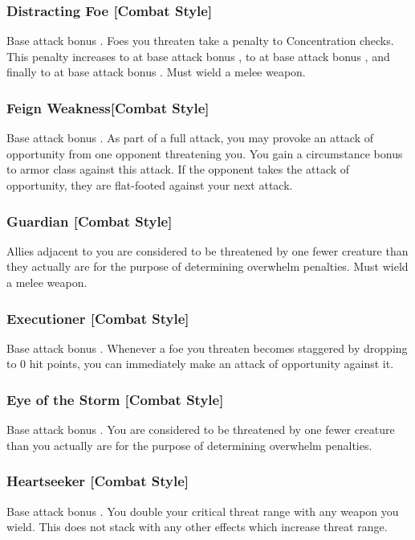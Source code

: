 \subsubsection{Distracting Foe [Combat Style]}
 Base attack bonus .
 Foes you threaten take a  penalty to Concentration checks. This penalty increases to  at base attack bonus , to  at base attack bonus , and finally to  at base attack bonus .
 Must wield a melee weapon.

\subsubsection{Feign Weakness[Combat Style]}
\featpre Base attack bonus .
\featben As part of a full attack, you may provoke an attack of opportunity from one opponent threatening you. You gain a  circumstance bonus to armor class against this attack. If the opponent takes the attack of opportunity, they are flat-footed against your next attack.

\subsubsection{Guardian [Combat Style]}
 Allies adjacent to you are considered to be threatened by one fewer creature than they actually are for the purpose of determining overwhelm penalties.
 Must wield a melee weapon.

\subsubsection{Executioner [Combat Style]}
 Base attack bonus .
 Whenever a foe you threaten becomes staggered by dropping to 0 hit points, you can immediately make an attack of opportunity against it.

\subsubsection{Eye of the Storm [Combat Style]}
 Base attack bonus .
 You are considered to be threatened by one fewer creature than you actually are for the purpose of determining overwhelm penalties.

\subsubsection{Heartseeker [Combat Style]}
 Base attack bonus .
 You double your critical threat range with any weapon you wield. This does not stack with any other effects which increase threat range.

